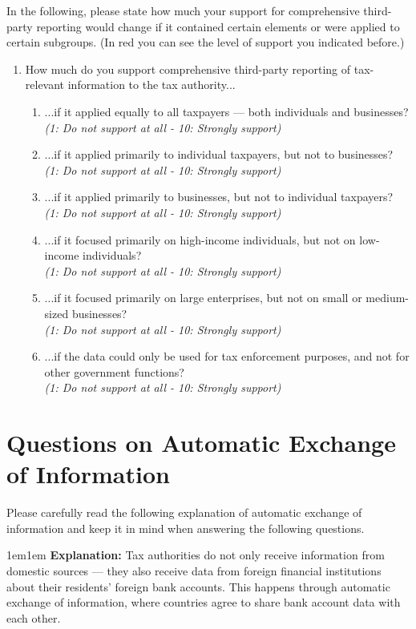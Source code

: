 \documentclass[11pt]{article}
\begin{document}
\noindent In the following, please state how much your support for comprehensive third-party reporting would change if it contained certain elements or were applied to certain subgroups. (In red you can see the level of support you indicated before.) \\  
\begin{enumerate}[resume]
    \item How much do you support comprehensive third-party reporting of tax-relevant information to the tax authority... 

\begin{enumerate}[label=\alph*)]
    \item ...if it applied equally to all taxpayers — both individuals and businesses?\\
    \textit{(1: Do not support at all - 10: Strongly support)}
    \item ...if it applied primarily to individual taxpayers, but not to businesses?\\
    \textit{(1: Do not support at all - 10: Strongly support)}
    \item ...if it applied primarily to businesses, but not to individual taxpayers?\\
    \textit{(1: Do not support at all - 10: Strongly support)}
    \item ...if it focused primarily on high-income individuals, but not on low-income individuals?\\
    \textit{(1: Do not support at all - 10: Strongly support)}
    \item ...if it focused primarily on large enterprises, but not on small or medium-sized businesses?\\
    \textit{(1: Do not support at all - 10: Strongly support)}
    \item ...if the data could only be used for tax enforcement purposes, and not for other government functions?\\
    \textit{(1: Do not support at all - 10: Strongly support)}
    \end{enumerate}
\end{enumerate}    




\section*{Questions on Automatic Exchange of Information}

Please carefully read the following explanation of automatic exchange of information and keep it in mind when answering the following questions.\\ 
\begin{adjustwidth}{1em}{1em} \textbf{Explanation:} Tax authorities do not only receive information from domestic sources — they also receive data from foreign financial institutions about their residents’ foreign bank accounts. This happens through automatic exchange of information, where countries agree to share bank account data with each other.  
\end{adjustwidth}
\end{document}
